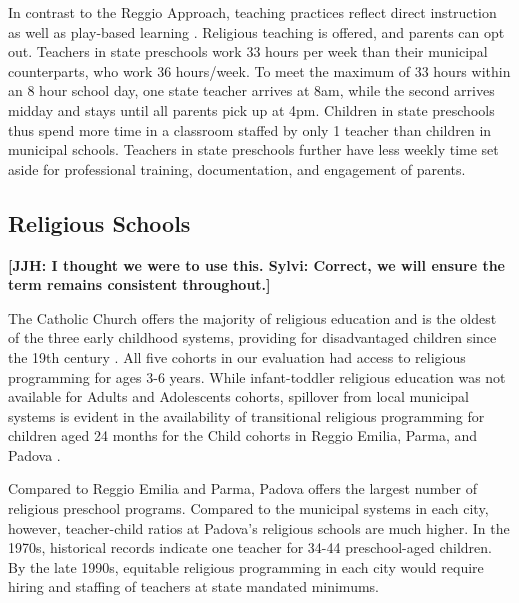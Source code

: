 In contrast to the Reggio Approach, teaching practices reflect direct instruction as well as play-based learning \citep{CEHD_2016_Historical-Analysis}. Religious teaching is offered, and parents can opt out. Teachers in state preschools work 33 hours per week than their municipal counterparts, who work 36 hours/week. To meet the maximum of 33 hours within an 8 hour school day, one state teacher arrives at 8am, while the second arrives midday and stays until all parents pick up at 4pm. Children in state preschools thus spend more time in a classroom staffed by only 1 teacher than children in municipal schools. Teachers in state preschools further have less weekly time set aside for professional training, documentation, and engagement of parents.

\subsection{Religious Schools}

\textbf{[JJH: I thought we were to use this. Sylvi: Correct, we will ensure the term remains consistent throughout.]}

The Catholic Church offers the majority of religious education and is the oldest of the three early childhood systems, providing for disadvantaged children since the 19th century \citep{OECD_2001_Italy-Country-Note}. All five cohorts in our evaluation had access to religious programming for ages 3-6 years. While infant-toddler religious education was not available for Adults and Adolescents cohorts, spillover from local municipal systems is evident in the availability of transitional religious programming for children aged 24 months for the Child cohorts in Reggio Emilia, Parma, and Padova \citep{Malizia-Cicatelli_2011_BOOK_Catholic-School}. 

Compared to Reggio Emilia and Parma, Padova offers the largest number of religious preschool programs. Compared to the municipal systems in each city, however, teacher-child ratios at Padova's religious schools are much higher. In the 1970s, historical records indicate one teacher for 34-44 preschool-aged children. By the late 1990s, equitable religious programming in each city would require hiring and staffing of teachers at state mandated minimums.

